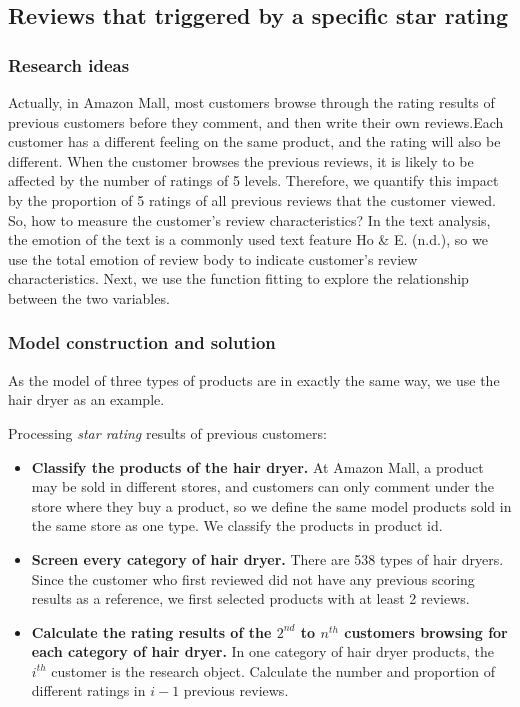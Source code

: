 \documentclass[12pt,a4paper,]{article}
\begin{document}
\hypertarget{reviews-that-triggered-by-a-specific-star-rating}{%
\subsection{Reviews that triggered by a specific star
rating}\label{reviews-that-triggered-by-a-specific-star-rating}}

\hypertarget{research-ideas}{%
\subsubsection{Research ideas}\label{research-ideas}}

Actually, in Amazon Mall, most customers browse through the rating
results of previous customers before they comment, and then write their
own reviews.Each customer has a different feeling on the same product,
and the rating will also be different. When the customer browses the
previous reviews, it is likely to be affected by the number of ratings
of 5 levels. Therefore, we quantify this impact by the proportion of 5
ratings of all previous reviews that the customer viewed. So, how to
measure the customer's review characteristics? In the text analysis, the
emotion of the text is a commonly used text feature Ho \& E. (n.d.), so
we use the total emotion of review body to indicate customer's review
characteristics. Next, we use the function fitting to explore the
relationship between the two variables.

\hypertarget{model-construction-and-solution}{%
\subsubsection{Model construction and
solution}\label{model-construction-and-solution}}

As the model of three types of products are in exactly the same way, we
use the hair dryer as an example.

Processing \emph{star rating} results of previous customers:

\begin{itemize}
\item
  \textbf{Classify the products of the hair dryer.} At Amazon Mall, a
  product may be sold in different stores, and customers can only
  comment under the store where they buy a product, so we define the
  same model products sold in the same store as one type. We classify
  the products in product id.
\item
  \textbf{Screen every category of hair dryer.} There are 538 types of
  hair dryers. Since the customer who first reviewed did not have any
  previous scoring results as a reference, we first selected products
  with at least 2 reviews.
\item
  \textbf{Calculate the rating results of the \(2^{nd}\) to \(n^{th}\)
  customers browsing for each category of hair dryer.} In one category
  of hair dryer products, the \(i^{th}\) customer is the research
  object. Calculate the number and proportion of different ratings in
  \(i-1\) previous reviews.
\end{itemize}
\end{document}
